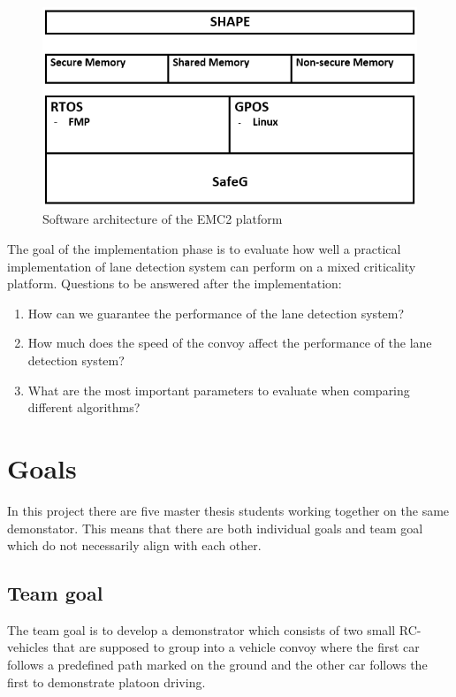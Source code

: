 \begin{figure}[H]
  \includegraphics[scale=1]{./img/architecture.png}
  \centering
  \caption{Software architecture of the EMC2 platform}
  \label{fig:Software architecture of the EMC2 platform}
\end{figure}

The goal of the implementation phase is to evaluate how well a practical implementation of lane detection system can perform on a mixed criticality platform. Questions to be answered after the implementation:

\begin{enumerate}  
\item How can we guarantee the performance of the lane detection system?
\item How much does the speed of the convoy affect the performance of the lane detection system?
\item What are the most important parameters to evaluate when comparing different algorithms?
\end{enumerate}

\section{Goals}
In this project there are five master thesis students working together on the same demonstator. This means that there are both individual goals and team goal which do not necessarily align with each other.

\subsection{Team goal}
The team goal is to develop a demonstrator which consists of two small RC-vehicles that are supposed to group into a vehicle convoy where the first car follows a predefined path marked on the ground and the other car follows the first to demonstrate platoon driving.

